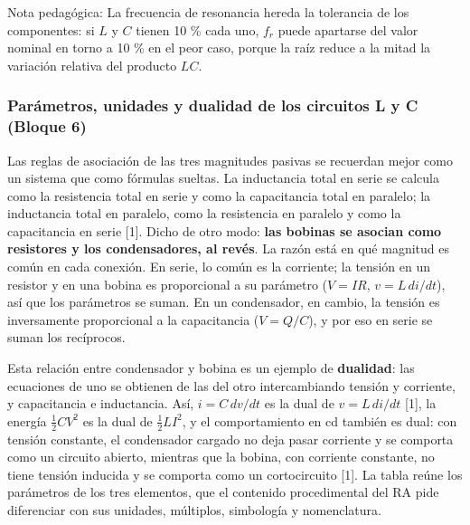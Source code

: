 \documentclass[11pt,letterpaper]{article}
\begin{document}
\begin{nota}{Nota pedagógica:}
La frecuencia de resonancia hereda la tolerancia de los componentes: si $L$ y $C$ tienen \textpm{}10 \% cada uno, $f_r$ puede apartarse del valor nominal en torno a \textpm{}10 \% en el peor caso, porque la raíz reduce a la mitad la variación relativa del producto $LC$.
\end{nota}

\subsubsection{Parámetros, unidades y dualidad de los circuitos L y C (Bloque 6)}

Las reglas de asociación de las tres magnitudes pasivas se recuerdan mejor como un sistema que como fórmulas sueltas. La inductancia total en serie se calcula como la resistencia total en serie y como la capacitancia total en paralelo; la inductancia total en paralelo, como la resistencia en paralelo y como la capacitancia en serie [1]. Dicho de otro modo: \textbf{las bobinas se asocian como resistores y los condensadores, al revés}. La razón está en qué magnitud es común en cada conexión. En serie, lo común es la corriente; la tensión en un resistor y en una bobina es proporcional a su parámetro ($V = IR$, $v = L\,di/dt$), así que los parámetros se suman. En un condensador, en cambio, la tensión es inversamente proporcional a la capacitancia ($V = Q/C$), y por eso en serie se suman los recíprocos.

Esta relación entre condensador y bobina es un ejemplo de \textbf{dualidad}: las ecuaciones de uno se obtienen de las del otro intercambiando tensión y corriente, y capacitancia e inductancia. Así, $i = C\,dv/dt$ es la dual de $v = L\,di/dt$ [1], la energía $\tfrac{1}{2}CV^2$ es la dual de $\tfrac{1}{2}LI^2$, y el comportamiento en cd también es dual: con tensión constante, el condensador cargado no deja pasar corriente y se comporta como un circuito abierto, mientras que la bobina, con corriente constante, no tiene tensión inducida y se comporta como un cortocircuito [1]. La tabla reúne los parámetros de los tres elementos, que el contenido procedimental del RA pide diferenciar con sus unidades, múltiplos, simbología y nomenclatura.
\end{document}
